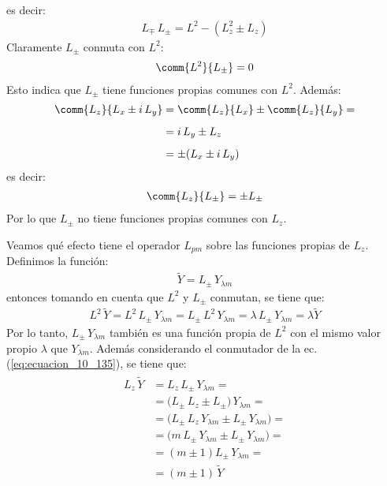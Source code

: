 es decir:
\begin{align}
L_{\mp} \, L_{\pm} = L^{2} - (L_{z}^{2} \pm L_{z})
\label{eq:ecuacion_10_132}
\end{align}
Claramente $L_{\pm}$ conmuta con $L^{2}$:
\begin{align}
\comm{L^{2}}{L_{\pm}} = 0
\label{eq:ecuacion_10_133}
\end{align}
Esto indica que $L_{\pm}$ tiene funciones propias comunes con $L^{2}$. Además:
\begin{align}
\begin{aligned}[b]
\comm{L_{z}}{L_{x} \pm i \, L_{y}} &= \comm{L_{z}}{L_{x}} \pm \comm{L_{z}}{L_{y}} = \\[0.5em]
&= i \, L_{y} \pm L_{z} \\[0.5em]
&= \pm (L_{x} \pm i \, L_{y}) 
\end{aligned}
\label{eq:ecuacion_10_134}
\end{align}
es decir:
\begin{align}
\comm{L_{z}}{L_{\pm}} = \pm L_{\pm}
\label{eq:ecuacion_10_135}
\end{align}
Por lo que $L_{\pm}$ no tiene funciones propias comunes con $L_{z}$.
\par
Veamos qué efecto tiene el operador $L_{pm}$ sobre las funciones propias de $L_{z}$. Definimos la función:
\begin{align}
\tilde{Y} = L_{\pm} \, Y_{\lambda m}
\label{eq:ecuacion_10_136}
\end{align}
entonces tomando en cuenta que $L^{2}$ y $L_{\pm}$ conmutan, se tiene que:
\begin{align}
L^{2} \, \tilde{Y} = L^{2} \, L_{\pm} \, Y_{\lambda m} = L_{\pm} \, L^{2} \, Y_{\lambda m} = \lambda \, L_{\pm} \, Y_{\lambda m} = \lambda \tilde{Y} 
\label{eq:ecuacion_10_137}
\end{align}
Por lo tanto, $L_{\pm} \, Y_{\lambda m}$ también es una función propia de $L^{2}$ con el mismo valor propio $\lambda$ que $Y_{\lambda m}$. Además considerando el conmutador de la ec. (\ref{eq:ecuacion_10_135}), se tiene que:
\begin{align}
\begin{aligned}
L_{z} \, \tilde{Y} &= L_{z} \, L_{\pm} \, Y_{\lambda m} = \\[0.5em]
&= \big( L_{\pm} \, L_{z} \pm L_{\pm} \big) \, Y_{\lambda m} = \\[0.5em]
&= \big( L_{\pm} \, L_{z} \, Y_{\lambda m} \pm L_{\pm}  \, Y_{\lambda m} \big) = \\[0.5em]
&= \big( m \, L_{\pm} \, Y_{\lambda m} \pm L_{\pm} \, Y_{\lambda m} \big) = \\[0.5em]
&= (m \pm 1) L_{\pm} \, Y_{\lambda m} = \\[0.5em]
&= (m \pm  1) \, \tilde{Y}
\end{aligned}
\label{eq:ecuacion_10_138}
\end{align}
